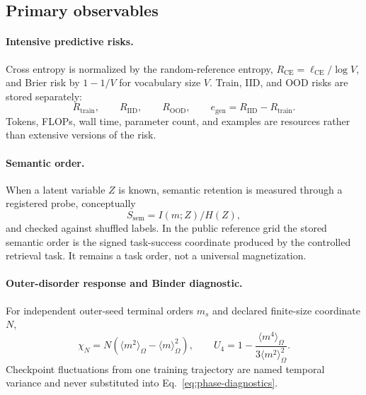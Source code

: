 
\subsection{Primary observables}

\paragraph{Intensive predictive risks.}
Cross entropy is normalized by the random-reference entropy,
$R_{\mathrm{CE}}=\ell_{\mathrm{CE}}/\log V$, and Brier risk by $1-1/V$ for
vocabulary size $V$. Train, IID, and OOD risks are stored separately:
\begin{equation}
  R_{\mathrm{train}},\qquad R_{\mathrm{IID}},\qquad R_{\mathrm{OOD}},
  \qquad e_{\mathrm{gen}}=R_{\mathrm{IID}}-R_{\mathrm{train}}.
\end{equation}
Tokens, FLOPs, wall time, parameter count, and examples are resources rather
than extensive versions of the risk.

\paragraph{Semantic order.}
When a latent variable $Z$ is known, semantic retention is measured through a
registered probe, conceptually
\begin{equation}
  S_{\mathrm{sem}}=I(m;Z)/H(Z),
\end{equation}
and checked against shuffled labels. In the public reference grid the stored
semantic order is the signed task-success coordinate produced by the controlled
retrieval task. It remains a task order, not a universal magnetization.

\paragraph{Outer-disorder response and Binder diagnostic.}
For independent outer-seed terminal orders $m_s$ and declared finite-size
coordinate $N$,
\begin{equation}
  \chi_N=N\left(\langle m^2\rangle_{\Omega}
  -\langle m\rangle_{\Omega}^2\right),\qquad
  U_4=1-\frac{\langle m^4\rangle_{\Omega}}
  {3\langle m^2\rangle_{\Omega}^2}.
  \label{eq:phase-diagnostics}
\end{equation}
Checkpoint fluctuations from one training trajectory are named temporal
variance and never substituted into Eq.~\eqref{eq:phase-diagnostics}.

